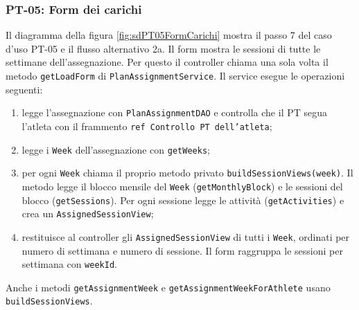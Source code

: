 \subsubsection{PT-05: Form dei carichi}
Il diagramma della figura \ref{fig:sdPT05FormCarichi} mostra il passo
7 del caso d'uso PT-05 e il flusso alternativo 2a. Il form mostra le
sessioni di tutte le settimane dell'assegnazione. Per questo il
controller chiama una sola volta il metodo \texttt{getLoadForm} di
\texttt{PlanAssignmentService}. Il service esegue le operazioni
seguenti:
\begin{enumerate}
  \item legge l'assegnazione con \texttt{PlanAssignmentDAO} e
    controlla che il PT segua l'atleta con il frammento
    \texttt{ref Controllo PT dell'atleta};
  \item legge i \texttt{Week} dell'assegnazione con
    \texttt{getWeeks};
  \item per ogni \texttt{Week} chiama il proprio metodo privato
    \texttt{buildSessionViews(week)}. Il metodo legge il blocco mensile del
    \texttt{Week} (\texttt{getMonthlyBlock}) e le sessioni del blocco
    (\texttt{getSessions}). Per ogni sessione legge le attività
    (\texttt{getActivities}) e crea un \texttt{AssignedSessionView};
  \item restituisce al controller gli \texttt{AssignedSessionView} di
    tutti i \texttt{Week}, ordinati per numero di settimana e numero di
    sessione. Il form raggruppa le sessioni per settimana con
    \texttt{weekId}.
\end{enumerate}
Anche i metodi \texttt{getAssignmentWeek} e
\texttt{getAssignmentWeekForAthlete} usano \texttt{buildSessionViews}.

